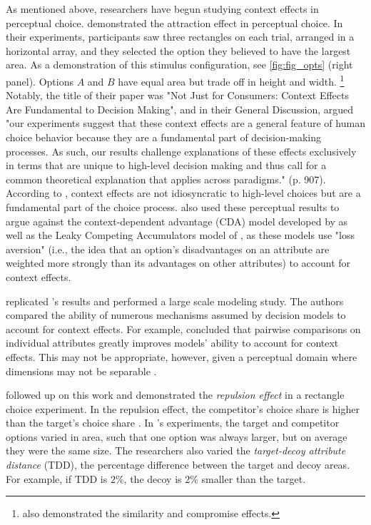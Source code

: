 \documentclass{umassthesis}          %
\begin{document}
As mentioned above, researchers have begun studying context effects in perceptual choice. \textcite{trueblood2013not} demonstrated the attraction effect in perceptual choice. In their experiments, participants saw three rectangles on each trial, arranged in a horizontal array, and they selected the option they believed to have the largest area. As a demonstration of this stimulus configuration, see \ref{fig:fig_opts} (right panel).  Options $A$ and $B$ have equal area but trade off in height and width. \footnote{\textcite{trueblood2013not} also demonstrated the similarity and compromise effects.} Notably, the title of their paper was "Not Just for Consumers: Context Effects Are Fundamental to Decision Making", and in their General Discussion, \textcite{trueblood2013not} argued "our experiments suggest that these context effects are a general feature of human choice behavior because they are a fundamental part of decision-making processes. As such, our results challenge explanations of these effects exclusively in terms that are unique to high-level decision making and thus call for a common theoretical explanation that applies across paradigms." (p. 907). According to \textcite{trueblood2013not}, context effects are not idiosyncratic to high-level choices but are a fundamental part of the choice process. \textcite{trueblood2013not} also used these perceptual results to argue against the context-dependent advantage (CDA) model developed by \textcite{tversky1993} as well as the Leaky Competing Accumulators model of \textcite{usherLossAversionInhibition2004a}, as these models use "loss aversion" (i.e., the idea that an option's disadvantages on an attribute are weighted more strongly than its advantages on other attributes) to account for context effects. 

\textcite{turnerCompetingTheoriesMultialternative2018a} replicated \textcite{trueblood2013not}'s results and performed a large scale modeling study. The authors compared the ability of numerous mechanisms assumed by decision models to account for context effects. For example, \textcite{turnerCompetingTheoriesMultialternative2018a} concluded that pairwise comparisons on individual attributes greatly improves models' ability to account for context effects. This may not be appropriate, however, given a perceptual domain where dimensions may not be separable \parencite{ashbyVarietiesPerceptualIndependence1986a}. 

\textcite{spektorWhenGoodLooks2018b} followed up on this work and demonstrated the \textit{repulsion effect} in a rectangle choice experiment. In the repulsion effect, the competitor's choice share is higher than the target's choice share \parencite{liaoInfluenceDistanceDecoy2021,evansImpactPresentationOrder2021,simonsonVicesVirtuesMisguided2014,frederickLimitsAttraction2014b,spektorRepulsionEffectPreferential2022,banerjeeFactorsThatPromote2024,bhui2021rational}. In \textcite{spektorWhenGoodLooks2018b}'s experiments, the target and competitor options varied in area, such that one option was always larger, but on average they were the same size. The researchers also varied the \textit{target-decoy attribute distance} (TDD), the percentage difference between the target and decoy areas. For example, if TDD is $2\%$, the decoy is $2\%$ smaller than the target. 
\end{document}
